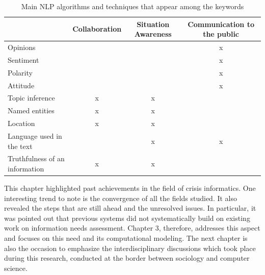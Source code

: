 \begin{table}
    \centering
    \caption{Main NLP algorithms and techniques that appear among the keywords}
    \label{table:lit-review-summary}
    \begin{tabular}{l|ccc}
                                       & Collaboration & Situation Awareness & Communication to the public \\
        \toprule
        Opinions                       &               &                     & x                           \\
        Sentiment                      &               &                     & x                           \\
        Polarity                       &               &                     & x                           \\
        Attitude                       &               &                     & x                           \\
        Topic inference                & x             & x                   &                             \\
        Named entities                 & x             & x                   &                             \\
        Location                       & x             & x                   &                             \\
        Language used in the text      &               & x                   & x                           \\
        Truthfulness of an information & x             & x                   &                             \\
        \bottomrule
    \end{tabular}
\end{table}

This chapter highlighted past achievements in the field of crisis informatics.
One interesting trend to note is the convergence of all the fields studied.
It also revealed the steps that are still ahead and the unresolved issues.
In particular, it was pointed out that previous systems did not systematically build on existing work on information needs assessment.
Chapter 3, therefore, addresses this aspect and focuses on this need and its computational modeling.
The next chapter is also the occasion to emphasize the interdisciplinary discussions which took place during this research, conducted at the border between sociology and computer science.

